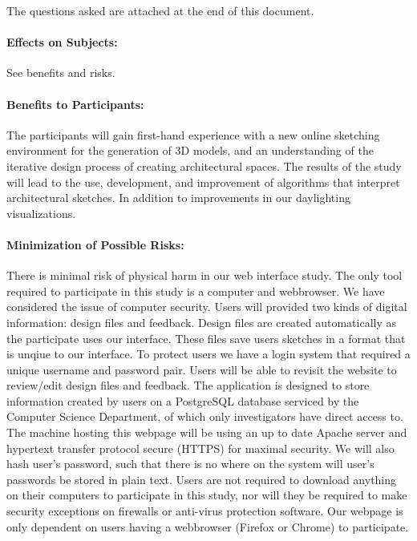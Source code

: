 \documentclass[12pt]{article}
\begin{document}
\noindent
The questions asked are attached at the end of this document.

\paragraph{Effects on Subjects:} See benefits and risks.

\paragraph{Benefits to Participants:}
%
The participants will gain first-hand experience with a new online sketching
environment for the generation of 3D models, and an understanding of the 
iterative design process of creating architectural spaces. The results 
of the study will lead to the use, development, and improvement of algorithms that
interpret architectural sketches. In addition to improvements in our daylighting 
visualizations.


\paragraph{Minimization of Possible Risks:}   
There is minimal risk  of physical harm in our web interface study. 
The only tool required to participate in this study is a computer and webbrowser.
We have considered the issue of computer security. Users will provided two kinds 
of digital information: design files and feedback. Design files are created automatically as the
participate uses our interface. These files save users sketches in a format that is unqiue to our interface.
To protect users we have a login system that required a unique username and password pair. Users will be able to
revisit the website to review/edit design files and feedback.
The application is designed to store information created by users on a PostgreSQL 
database serviced by the Computer Science Department, of which only investigators have direct access to.
The machine hosting this webpage will be using an up to date Apache server and hypertext transfer protocol secure (HTTPS)
for maximal security. We will also hash user's password, such that there is no where on the system will
user's passwords be stored in plain text.
Users are not required to download anything on their computers to participate in this study, nor will
they be required to make security exceptions on firewalls or anti-virus protection software.
Our webpage is only dependent on users having a webbrowser (Firefox or Chrome) to participate.
\end{document}
